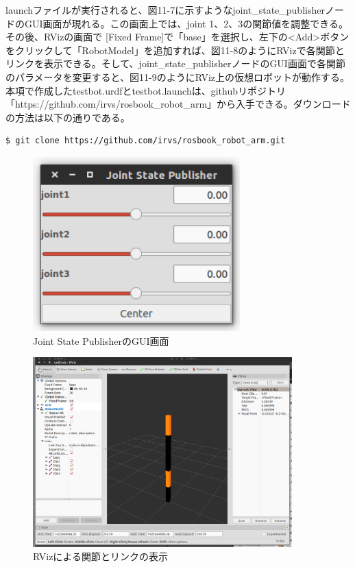 launchファイルが実行されると、図11-7に示すようなjoint\_state\_publisherノードのGUI画面が現れる。この画面上では、joint 1、2、3の関節値を調整できる。その後、RVizの画面で [Fixed Frame]で「base」を選択し、左下の<Add>ボタンをクリックして「RobotModel」を追加すれば、図11-8のようにRVizで各関節とリンクを表示できる。そして、joint\_state\_publisherノードのGUI画面で各関節のパラメータを変更すると、図11-9のようにRViz上の仮想ロボットが動作する。
本項で作成したtestbot.urdfとtestbot.launchは、githubリポジトリ「https://github.com/irvs/rosbook\_robot\_arm」から入手できる。ダウンロードの方法は以下の通りである。

\begin{lstlisting}[language=ROS]
$ git clone https://github.com/irvs/rosbook_robot_arm.git
\end{lstlisting}

\begin{figure}[htp]
  \centering
  \includegraphics[width=8cm]{pictures/chapter11/pic_11_07.png}
  \caption{Joint State PublisherのGUI画面}
\end{figure}

\begin{figure}[htp]
  \centering
  \includegraphics[width=10cm]{pictures/chapter11/pic_11_08.png}
  \caption{RVizによる関節とリンクの表示}
\end{figure}

